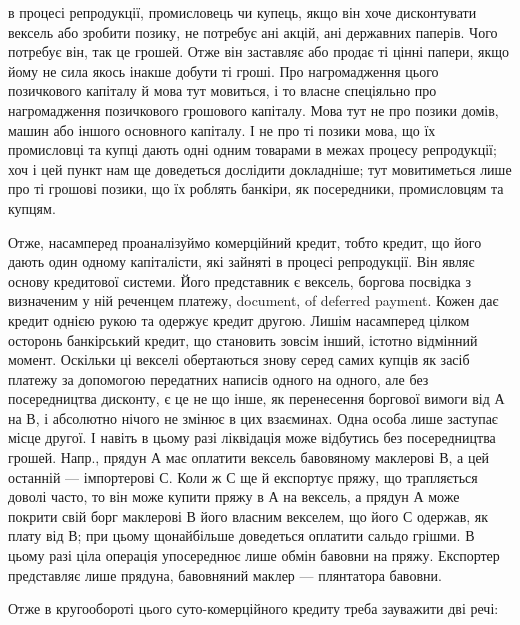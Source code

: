 в процесі репродукції, промисловець чи купець, якщо він хоче дисконтувати
вексель або зробити позику, не потребує ані акцій, ані державних паперів. Чого
потребує він, так це грошей. Отже він заставляє або продає ті цінні папери, якщо
йому не сила якось інакше добути ті гроші. Про нагромадження цього позичкового
капіталу й мова тут мовиться, і то власне спеціяльно про нагромадження позичкового
грошового капіталу. Мова тут не про позики домів, машин або іншого
основного капіталу. І не про ті позики мова, що їх промисловці та купці дають
одні одним товарами в межах процесу репродукції; хоч і цей пункт нам ще
доведеться дослідити докладніше; тут мовитиметься лише про ті грошові позики,
що їх роблять банкіри, як посередники, промисловцям та купцям.

Отже, насамперед проаналізуймо комерційний кредит, тобто кредит, що його
дають один одному капіталісти, які зайняті в процесі репродукції. Він являє
основу кредитової системи. Його представник є вексель, боргова посвідка з визначеним
у ній реченцем платежу, document, of deferred payment. Кожен дає кредит
однією рукою та одержує кредит другою. Лишім насамперед цілком осторонь банкірський
кредит, що становить зовсім інший, істотно відмінний момент. Оскільки ці
векселі обертаються знову серед самих купців як засіб платежу за допомогою
передатних написів одного на одного, але без посередництва дисконту, є це не
що інше, як перенесення боргової вимоги від А на В, і абсолютно нічого не
змінює в цих взаєминах. Одна особа лише заступає місце другої. І навіть
в цьому разі ліквідація може відбутись без посередництва грошей. Напр., прядун
А має оплатити вексель бавовяному маклерові В, а цей останній — імпортерові С.
Коли ж С ще й експортує пряжу, що трапляється доволі часто, то він може
купити пряжу в А на вексель, а прядун А може покрити свій борг маклерові В
його власним векселем, що його С одержав, як плату від В; при цьому щонайбільше
доведеться оплатити сальдо грішми. В цьому разі ціла операція
упосереднює лише обмін бавовни на пряжу. Експортер представляє лише прядуна,
бавовняний маклер — плянтатора бавовни.

Отже в кругообороті цього суто-комерційного кредиту треба зауважити дві речі:

